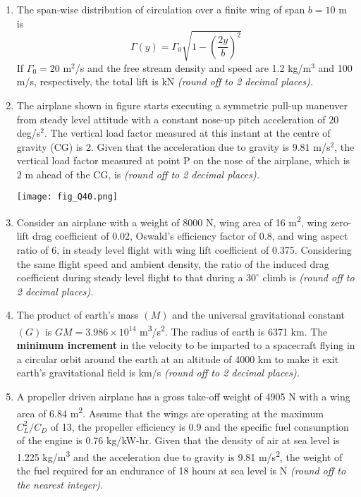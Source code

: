 \documentclass[12pt]{article}
\begin{document}
\begin{enumerate}[label=Q.\arabic*, start=26]
	\item The span-wise distribution of circulation over a finite wing of span $b = 10$ m is
		\[
			\Gamma(y) = \Gamma_0 \sqrt{1 - \left(\frac{2y}{b}\right)^2 }
		\]
		If $\Gamma_0 = 20$ m$^2$/s and the free stream density and speed are 1.2 kg/m$^3$ and 100 m/s, respectively, the total lift is \underline{\hspace{2cm}} kN \textit{(round off to 2 decimal places).}
		\newpage
	\item The airplane shown in figure starts executing a symmetric pull-up maneuver from steady level attitude with a constant nose-up pitch acceleration of $20$ deg/s$^2$. The vertical load factor measured at this instant at the centre of gravity (CG) is $2$. Given that the acceleration due to gravity is $9.81$ m/s$^2$, the vertical load factor measured at point P on the nose of the airplane, which is $2$ m ahead of the CG, is \underline{\hspace{2cm}} \textit{(round off to 2 decimal places).}
		\begin{center}
			\texttt{[image: fig\_Q40.png]} 
		\end{center}
	\item Consider an airplane with a weight of 8000 N, wing area of 16 m\textsuperscript{2}, wing zero-lift drag coefficient of 0.02, Oswald’s efficiency factor of 0.8, and wing aspect ratio of 6, in steady level flight with wing lift coefficient of 0.375. Considering the same flight speed and ambient density, the ratio of the induced drag coefficient during steady level flight to that during a $30^\circ$ climb is \underline{\hspace{2cm}} \textit{(round off to 2 decimal places).}\\

	\item The product of earth’s mass $(M)$ and the universal gravitational constant $(G)$ is $GM = 3.986 \times 10^{14}$ m\textsuperscript{3}/s\textsuperscript{2}. The radius of earth is 6371 km. The \textbf{minimum increment} in the velocity to be imparted to a spacecraft flying in a circular orbit around the earth at an altitude of 4000 km to make it exit earth’s gravitational field is \underline{\hspace{2cm}} km/s \textit{(round off to 2 decimal places).}\\
	\item A propeller driven airplane has a gross take-off weight of 4905 N with a wing area of 6.84 m\textsuperscript{2}. Assume that the wings are operating at the maximum $C_L^2/C_D$ of 13, the propeller efficiency is 0.9 and the specific fuel consumption of the engine is 0.76 kg/kW-hr. Given that the density of air at sea level is 1.225 kg/m\textsuperscript{3} and the acceleration due to gravity is 9.81 m/s\textsuperscript{2}, the weight of the fuel required for an endurance of 18 hours at sea level is \underline{\hspace{2cm}} N \textit{(round off to the nearest integer).}\\


\end{enumerate}
\end{document}
